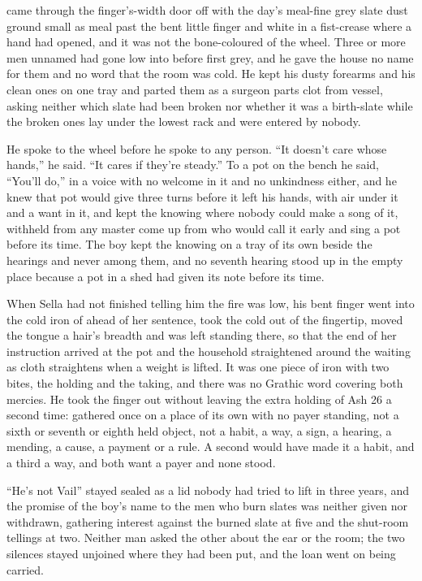 \scenebreak

 came through the finger's-width door off  with the day's meal-fine grey slate dust ground small as meal past the bent little finger and white in a fist-crease where a hand had opened, and it was not the bone-coloured  of the wheel. Three or more men unnamed had gone low into  before first grey, and he gave the house no name for them and no word that the room was cold. He kept his dusty forearms and his clean ones on one tray and parted them as a surgeon parts clot from vessel, asking neither which slate had been broken nor whether it was a birth-slate while the broken ones lay under the lowest rack and were entered by nobody.

He spoke to the wheel before he spoke to any person. “It doesn't care whose hands,” he said. “It cares if they're steady.” To a pot on the bench he said, “You'll do,” in a voice with no welcome in it and no unkindness either, and he knew  that pot would give three turns before it left his hands, with air under it and a want in it, and kept the knowing where nobody could make a song of it, withheld from any master come up from  who would call it early and sing a pot before its time. The boy kept the knowing on a tray of its own beside the hearings and never among them, and no seventh hearing stood up in the empty place because a pot in a shed had given its note before its time.

When Sella had not finished telling him the fire was low, his bent finger went into the cold iron of  ahead of her sentence, took the cold out of the fingertip, moved the tongue a hair's breadth and was left standing there, so that the end of her instruction arrived at the pot and the household straightened around the waiting as cloth straightens when a weight is lifted. It was one piece of iron with two bites, the holding and the taking, and there was no Grathic word covering both mercies. He took the finger out without leaving the extra holding of Ash 26 a second time: gathered once on a place of its own with no payer standing, not a sixth or seventh or eighth held object, not a habit, a way, a sign, a hearing, a mending, a cause, a payment or a rule. A second would have made it a habit, and a third a way, and both want a payer and none stood.

“He's not Vail” stayed sealed as a lid nobody had tried to lift in three years, and the promise of the boy's name to the men who burn slates was neither given nor withdrawn, gathering interest against the burned slate at five and the shut-room tellings at two. Neither man asked the other about the ear or the room; the two silences stayed unjoined where they had been put, and the loan went on being carried.

